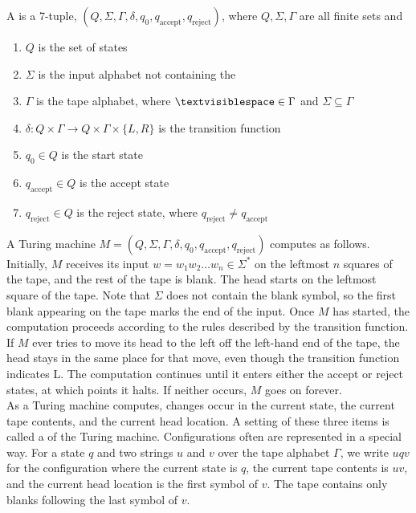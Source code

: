 \documentclass{article}
\begin{document}
\begin{definition}
  A  is a 7-tuple, $(Q, \Sigma , \Gamma, \delta, q_0 , q_{\textrm{accept}} , q_{\textrm{reject}})$, where $Q, \Sigma, \Gamma$ are all finite sets and 
  \begin{enumerate}
    \item $Q$ is the set of states 
    \item $\Sigma$ is the input alphabet not containing the  \textvisiblespace
    \item $\Gamma$ is the tape alphabet, where $\textvisiblespace \in \Gamma$ and $\Sigma \subseteq \Gamma$ 
    \item $\delta: Q \times \Gamma \rightarrow Q \times \Gamma \times \{L,R\}$ is the transition function 
    \item $q_0 \in Q$ is the start state 
    \item $q_{\textrm{accept}} \in Q$ is the accept state 
    \item $q_{\textrm{reject}} \in Q$ is the reject state, where $q_{\textrm{reject}} \neq q_{\textrm{accept}}$ 
  \end{enumerate}
\end{definition}

A Turing machine $M=(Q, \Sigma, \Gamma , \delta , q_0 , q_{\textrm{accept}} , q_{\textrm{reject}})$ computes as follows. Initially, $M$ receives its input $w = w_1 w_2 \dots w_n \in \Sigma^{*}$ on the leftmost $n$ squares of the tape, and the rest of the tape is blank. The head starts on the leftmost square of the tape. Note that $\Sigma$ does not contain the blank symbol, so the first blank appearing on the tape marks the end of the input. Once $M$ has started, the computation proceeds according to the rules described by the transition function. If $M$ ever tries to move its head to the left off the left-hand end of the tape, the head stays in the same place for that move, even though the transition function indicates L. The computation continues until it enters either the accept or reject states, at which points it halts. If neither occurs, $M$ goes on forever.  \\ 

As a Turing machine computes, changes occur in the current state, the current tape contents, and the current head location. A setting of these three items is called a  of the Turing machine. Configurations often are represented in a special way. For a state $q$ and two strings $u$ and $v$ over the tape alphabet $\Gamma$, we write $u q v$ for the configuration where the current state is $q$, the current tape contents is $uv$, and the current head location is the first symbol of $v$. The tape contains only blanks following the last symbol of $v$. \\ 
\end{document}
